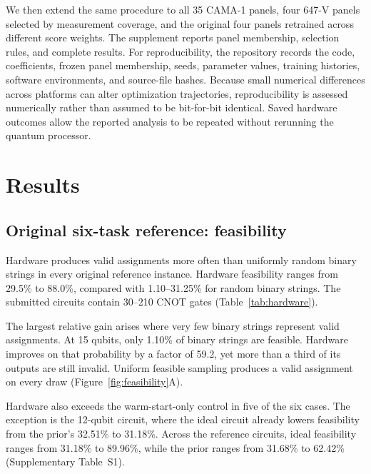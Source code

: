 \documentclass[utf8]{FrontiersinHarvard}
\begin{document}
We then extend the same procedure to all 35 CAMA-1 panels, four 647-V panels selected by measurement coverage, and the original four panels retrained across different score weights. The supplement reports panel membership, selection rules, and complete results. For reproducibility, the repository records the code, coefficients, frozen panel membership, seeds, parameter values, training histories, software environments, and source-file hashes. Because small numerical differences across platforms can alter optimization trajectories, reproducibility is assessed numerically rather than assumed to be bit-for-bit identical. Saved hardware outcomes allow the reported analysis to be repeated without rerunning the quantum processor.

\section{Results}
\subsection{Original six-task reference: feasibility}
Hardware produces valid assignments more often than uniformly random binary strings in every original reference instance. Hardware feasibility ranges from 29.5\% to 88.0\%, compared with 1.10--31.25\% for random binary strings. The submitted circuits contain 30--210 CNOT gates (Table~\ref{tab:hardware}).

The largest relative gain arises where very few binary strings represent valid assignments. At 15 qubits, only 1.10\% of binary strings are feasible. Hardware improves on that probability by a factor of 59.2, yet more than a third of its outputs are still invalid. Uniform feasible sampling produces a valid assignment on every draw (Figure~\ref{fig:feasibility}A).

Hardware also exceeds the warm-start-only control in five of the six cases. The exception is the 12-qubit circuit, where the ideal circuit already lowers feasibility from the prior's 32.51\% to 31.18\%. Across the reference circuits, ideal feasibility ranges from 31.18\% to 89.96\%, while the prior ranges from 31.68\% to 62.42\% (Supplementary Table~S1).
\end{document}

